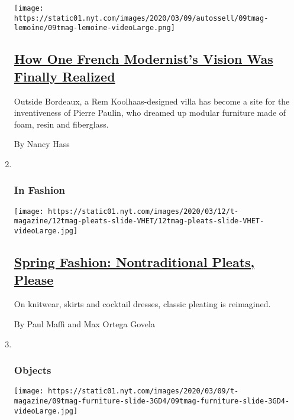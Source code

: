 \begin{enumerate}
  \texttt{[image: https://static01.nyt.com/images/2020/03/09/autossell/09tmag-lemoine/09tmag-lemoine-videoLarge.png]}

  \hypertarget{how-one-french-modernists-vision-was-finally-realized}{%
  \subsection{\texorpdfstring{\href{/2020/03/11/t-magazine/rem-koolhaas-pierre-paulin.html}{How
  One French Modernist's Vision Was Finally
  Realized}}{How One French Modernist's Vision Was Finally Realized}}\label{how-one-french-modernists-vision-was-finally-realized}}

  Outside Bordeaux, a Rem Koolhaas-designed villa has become a site for
  the inventiveness of Pierre Paulin, who dreamed up modular furniture
  made of foam, resin and fiberglass.

  By Nancy Hass
\item ~
  \hypertarget{in-fashion}{%
  \subsubsection{In Fashion}\label{in-fashion}}

  \texttt{[image: https://static01.nyt.com/images/2020/03/12/t-magazine/12tmag-pleats-slide-VHET/12tmag-pleats-slide-VHET-videoLarge.jpg]}

  \hypertarget{spring-fashion-nontraditional-pleats-please}{%
  \subsection{\texorpdfstring{\href{/2020/03/12/t-magazine/spring-fashion-pleats.html}{Spring
  Fashion: Nontraditional Pleats,
  Please}}{Spring Fashion: Nontraditional Pleats, Please}}\label{spring-fashion-nontraditional-pleats-please}}

  On knitwear, skirts and cocktail dresses, classic pleating is
  reimagined.

  By Paul Maffi and Max Ortega Govela
\item ~
  \hypertarget{objects}{%
  \subsubsection{Objects}\label{objects}}

  \texttt{[image: https://static01.nyt.com/images/2020/03/09/t-magazine/09tmag-furniture-slide-3GD4/09tmag-furniture-slide-3GD4-videoLarge.jpg]}


\end{enumerate}
